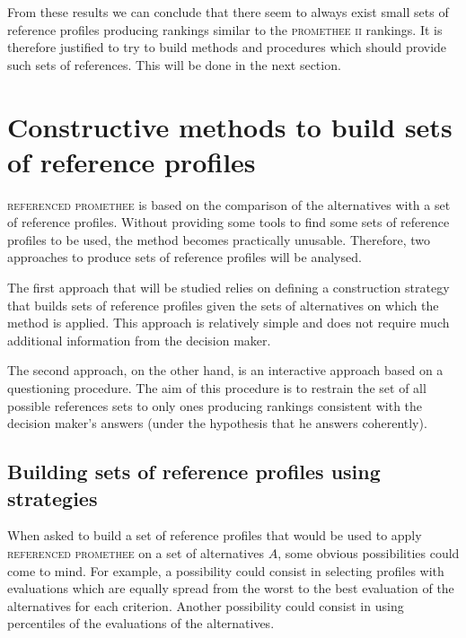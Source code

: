  From these results we can conclude that there seem to always exist small sets of reference profiles producing rankings similar to the \textsc{promethee ii} rankings.
It is therefore justified to try to build methods and procedures which should provide such sets of references.
This will be done in the next section.

\section{Constructive methods to build sets of reference profiles}

\textsc{referenced promethee} is based on the comparison of the alternatives with a set of reference profiles.
Without providing some tools to find some sets of reference profiles to be used, the method becomes practically unusable. 
Therefore, two approaches to produce sets of reference profiles will be analysed.

The first approach that will be studied relies on defining a construction strategy that builds sets of reference profiles given the sets of alternatives on which the method is applied.
This approach is relatively simple and does not require much additional information from the decision maker.

The second approach, on the other hand, is an interactive approach based on a questioning procedure.
The aim of this procedure is to restrain the set of all possible references sets to only ones producing rankings consistent with the decision maker's answers (under the hypothesis that he answers coherently).

\subsection{Building sets of reference profiles using strategies}
\label{sec:strategies}

When asked to build a set of reference profiles that would be used to apply \textsc{referenced promethee} on a set of alternatives $A$, some obvious possibilities could come to mind.
For example, a possibility could consist in selecting profiles with evaluations which are equally spread from the worst to the best evaluation of the alternatives for each criterion.
Another possibility could consist in using percentiles of the evaluations of the alternatives.

